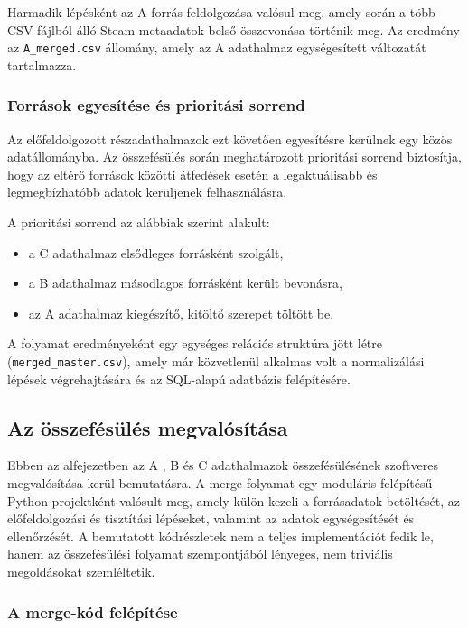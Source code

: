 Harmadik lépésként az A forrás feldolgozása valósul meg, amely során a több CSV-fájlból álló Steam-metaadatok belső összevonása történik meg. Az eredmény az \texttt{A\_merged.csv} állomány, amely az A adathalmaz egységesített változatát tartalmazza.

\subsubsection{Források egyesítése és prioritási sorrend}

Az előfeldolgozott részadathalmazok ezt követően egyesítésre kerülnek egy közös adatállományba. Az összefésülés során meghatározott prioritási sorrend biztosítja, hogy az eltérő források közötti átfedések esetén a legaktuálisabb és legmegbízhatóbb adatok kerüljenek felhasználásra.

A prioritási sorrend az alábbiak szerint alakult:
\begin{itemize}
    \item a C adathalmaz elsődleges forrásként szolgált,
    \item a B adathalmaz másodlagos forrásként került bevonásra,
    \item az A adathalmaz kiegészítő, kitöltő szerepet töltött be.
\end{itemize}

A folyamat eredményeként egy egységes relációs struktúra jött létre\\ (\texttt{merged\_master.csv}), amely már közvetlenül alkalmas volt a normalizálási lépések végrehajtására és az SQL-alapú adatbázis felépítésére.

\subsection{Az összefésülés megvalósítása}

Ebben az alfejezetben az A \cite{a}, B \cite{b} és C \cite{c} adathalmazok összefésülésének szoftveres megvalósítása kerül bemutatásra. A merge-folyamat egy moduláris felépítésű Python \cite{python} projektként valósult meg, amely külön kezeli a forrásadatok betöltését, az előfeldolgozási és tisztítási lépéseket, valamint az adatok egységesítését és ellenőrzését. A bemutatott kódrészletek nem a teljes implementációt fedik le, hanem az összefésülési folyamat szempontjából lényeges, nem triviális megoldásokat szemléltetik.

\subsubsection{A merge-kód felépítése}

